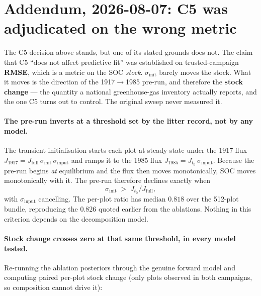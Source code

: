 \documentclass[11pt]{article}
\newcommand{\sinit}{\sigma_{\mathrm{init}}}
\newcommand{\sinput}{\sigma_{\mathrm{input}}}
\begin{document}
\section{Addendum, 2026-08-07: C5 was adjudicated on the wrong metric}

The C5 decision above stands, but one of its stated grounds does not. The claim that C5
``does not affect predictive fit'' was established on trusted-campaign \textbf{RMSE}, which is
a metric on the SOC \emph{stock}. $\sinit$ barely moves the stock. What it moves is the
direction of the 1917$\rightarrow$1985 pre-run, and therefore the \textbf{stock change} --- the
quantity a national greenhouse-gas inventory actually reports, and the one C5 turns out to
control. The original sweep never measured it.

\paragraph{The pre-run inverts at a threshold set by the litter record, not by any model.}
The transient initialisation starts each plot at steady state under the 1917 flux
$J_{1917} = J_{\mathrm{full}}\,\sinit\,\sinput$ and ramps it to the 1985 flux
$J_{1985} = J_{t_0}\,\sinput$. Because the pre-run begins \emph{at} equilibrium and the flux
then moves monotonically, SOC moves monotonically with it. The pre-run therefore declines
exactly when
\[
  \sinit \;>\; J_{t_0}/J_{\mathrm{full}},
\]
with $\sinput$ cancelling. The per-plot ratio has median $0.818$ over the 512-plot bundle,
reproducing the $0.826$ quoted earlier from the ablations. Nothing in this criterion depends on
the decomposition model.

\paragraph{Stock change crosses zero at that same threshold, in every model tested.}
Re-running the ablation posteriors through the genuine forward model and computing paired
per-plot stock change (only plots observed in both campaigns, so composition cannot drive it):
\end{document}
